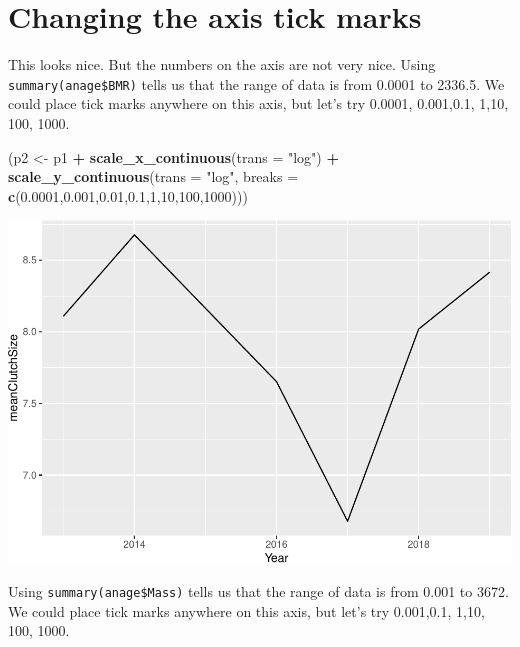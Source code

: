 \documentclass[
  a4paperpaper,
]{book}
\newenvironment{Shaded}{\begin{snugshade}}{\end{snugshade}}
\newcommand{\DataTypeTok}[1]{\textcolor[rgb]{0.13,0.29,0.53}{#1}}
\newcommand{\DecValTok}[1]{\textcolor[rgb]{0.00,0.00,0.81}{#1}}
\newcommand{\FloatTok}[1]{\textcolor[rgb]{0.00,0.00,0.81}{#1}}
\newcommand{\KeywordTok}[1]{\textcolor[rgb]{0.13,0.29,0.53}{\textbf{#1}}}
\newcommand{\NormalTok}[1]{#1}
\newcommand{\OperatorTok}[1]{\textcolor[rgb]{0.81,0.36,0.00}{\textbf{#1}}}
\newcommand{\StringTok}[1]{\textcolor[rgb]{0.31,0.60,0.02}{#1}}
\begin{document}
\hypertarget{changing-the-axis-tick-marks}{%
\section{Changing the axis tick marks}\label{changing-the-axis-tick-marks}}

This looks nice. But the numbers on the axis are not very nice. Using \texttt{summary(anage\$BMR)} tells us that the range of data is from 0.0001 to 2336.5. We could place tick marks anywhere on this axis, but let's try 0.0001, 0.001,0.1, 1,10, 100, 1000.

\begin{Shaded}
\begin{Highlighting}[]
\NormalTok{(p2 \textless{}{-}}\StringTok{ }\NormalTok{p1 }\OperatorTok{+}\StringTok{ }
\StringTok{  }\KeywordTok{scale\_x\_continuous}\NormalTok{(}\DataTypeTok{trans =} \StringTok{"log"}\NormalTok{) }\OperatorTok{+}
\StringTok{  }\KeywordTok{scale\_y\_continuous}\NormalTok{(}\DataTypeTok{trans =} \StringTok{"log"}\NormalTok{, }\DataTypeTok{breaks =} \KeywordTok{c}\NormalTok{(}\FloatTok{0.0001}\NormalTok{,}\FloatTok{0.001}\NormalTok{,}\FloatTok{0.01}\NormalTok{,}\FloatTok{0.1}\NormalTok{,}\DecValTok{1}\NormalTok{,}\DecValTok{10}\NormalTok{,}\DecValTok{100}\NormalTok{,}\DecValTok{1000}\NormalTok{)))}
\end{Highlighting}
\end{Shaded}

\begin{center}\includegraphics{BB852_files/figure-latex/unnamed-chunk-114-1} \end{center}

Using \texttt{summary(anage\$Mass)} tells us that the range of data is from 0.001 to 3672. We could place tick marks anywhere on this axis, but let's try 0.001,0.1, 1,10, 100, 1000.
\end{document}
